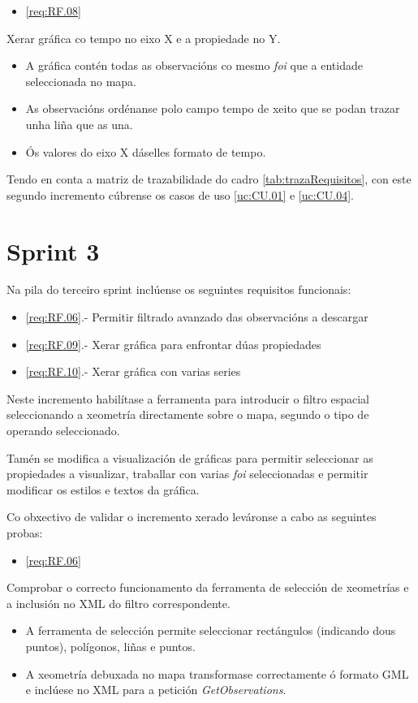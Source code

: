 		  {\begin{itemize}\item \ref{req:RF.08} \\\end{itemize}} %
		  {Xerar gráfica co tempo no eixo X e a propiedade no Y.} %
		  {\begin{itemize}
		  \item A gráfica contén todas as observacións co mesmo \emph{foi} que a entidade seleccionada no mapa.
		  \item As observacións ordénanse polo campo tempo de xeito que se podan trazar unha liña que as una.
		  \item Ós valores do eixo X dáselles formato de tempo.
		  \end{itemize}} %
		  
Tendo en conta a matriz de trazabilidade do cadro \ref{tab:trazaRequisitos}, con este segundo incremento cúbrense os casos de uso \ref{uc:CU.01} e \ref{uc:CU.04}.
		  
\section{Sprint 3}
Na pila do terceiro sprint inclúense os seguintes requisitos funcionais:
\begin{itemize}
\item \ref{req:RF.06}.- Permitir filtrado avanzado das observacións a descargar
\item \ref{req:RF.09}.- Xerar gráfica para enfrontar dúas propiedades
\item \ref{req:RF.10}.- Xerar gráfica con varias series
\end{itemize}

Neste incremento habilítase a ferramenta para introducir o filtro espacial seleccionando a xeometría directamente sobre o mapa, segundo o tipo de operando seleccionado.

Tamén se modifica a visualización de gráficas para permitir seleccionar as propiedades a visualizar, traballar con varias \emph{foi} seleccionadas e permitir modificar os estilos e textos da gráfica.

Co obxectivo de validar o incremento xerado leváronse a cabo as seguintes probas:

		  {\begin{itemize}\item \ref{req:RF.06} \\\end{itemize}} %
		  {Comprobar o correcto funcionamento da ferramenta de selección de xeometrías e a inclusión no XML do filtro correspondente.} %
		  {\begin{itemize}
		  \item A ferramenta de selección permite seleccionar rectángulos (indicando dous puntos), polígonos, liñas e puntos.
		  \item A xeometría debuxada no mapa transformase correctamente ó formato GML e inclúese no XML para a petición \emph{GetObservations}.
		  \end{itemize}} %
		  
